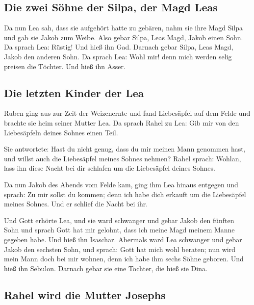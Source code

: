 \hypertarget{die-zwei-suxf6hne-der-silpa-der-magd-leas}{%
\subsection{Die zwei Söhne der Silpa, der Magd
Leas}\label{die-zwei-suxf6hne-der-silpa-der-magd-leas}}

 Da nun Lea sah, dass sie aufgehört hatte zu gebären, nahm
sie ihre Magd Silpa und gab sie Jakob zum Weibe.  Also
gebar Silpa, Leas Magd, Jakob einen Sohn.  Da sprach Lea:
Rüstig! Und hieß ihn Gad.  Darnach gebar Silpa, Leas
Magd, Jakob den anderen Sohn.  Da sprach Lea: Wohl mir!
denn mich werden selig preisen die Töchter. Und hieß ihn Asser.

\hypertarget{die-letzten-kinder-der-lea}{%
\subsection{Die letzten Kinder der
Lea}\label{die-letzten-kinder-der-lea}}

 Ruben ging aus zur Zeit der Weizenernte und fand
Liebesäpfel auf dem Felde und brachte sie heim seiner Mutter Lea. Da
sprach Rahel zu Lea: Gib mir von den Liebesäpfeln deines Sohnes einen
Teil.

 Sie antwortete: Hast du nicht genug, dass du mir meinen
Mann genommen hast, und willst auch die Liebesäpfel meines Sohnes
nehmen? Rahel sprach: Wohlan, lass ihn diese Nacht bei dir schlafen um
die Liebesäpfel deines Sohnes.

 Da nun Jakob des Abends vom Felde kam, ging ihm Lea
hinaus entgegen und sprach: Zu mir sollst du kommen; denn ich habe dich
erkauft um die Liebesäpfel meines Sohnes. Und er schlief die Nacht bei
ihr.

 Und Gott erhörte Lea, und sie ward schwanger und gebar
Jakob den fünften Sohn  und sprach Gott hat mir gelohnt,
dass ich meine Magd meinem Manne gegeben habe. Und hieß ihn Isaschar.
 Abermals ward Lea schwanger und gebar Jakob den sechsten
Sohn,  und sprach: Gott hat mich wohl beraten; nun wird
mein Mann doch bei mir wohnen, denn ich habe ihm sechs Söhne geboren.
Und hieß ihn Sebulon.  Darnach gebar sie eine Tochter,
die hieß sie Dina.

\hypertarget{rahel-wird-die-mutter-josephs}{%
\subsection{Rahel wird die Mutter
Josephs}\label{rahel-wird-die-mutter-josephs}}

